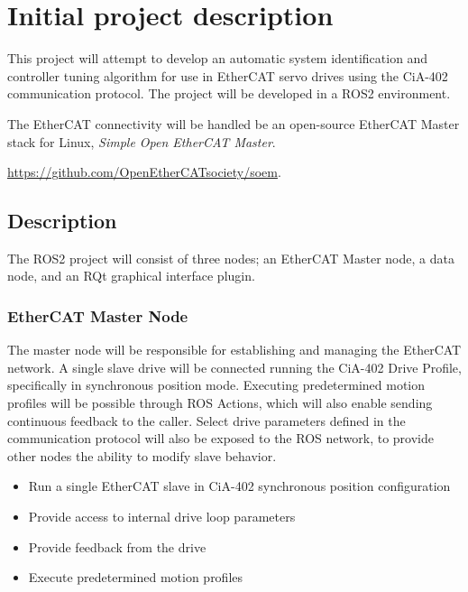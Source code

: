 \newcommand\pdescitemsep{-0.2em}
\section{Initial project description}

This project will attempt to develop an automatic system identification and controller tuning algorithm for use in EtherCAT servo drives using the CiA-402 communication protocol.
The project will be developed in a ROS2 environment. 
 
The EtherCAT connectivity will be handled be an open-source EtherCAT Master stack for Linux, \textit{Simple Open EtherCAT Master}.

\href{https://github.com/OpenEtherCATsociety/soem}{https://github.com/OpenEtherCATsociety/soem}. 

\subsection{Description}

\noindent
The ROS2 project will consist of three nodes; an EtherCAT Master node, a data node, and an RQt graphical interface plugin. 


\subsubsection{EtherCAT Master Node}

The master node will be responsible for establishing and managing the EtherCAT network.
A single slave drive will be connected running the CiA-402 Drive Profile, specifically in synchronous position mode.
Executing predetermined motion profiles will be possible through ROS Actions, which will also enable sending continuous feedback to the caller. 
Select drive parameters defined in the communication protocol will also be exposed to the ROS network, to provide other nodes the ability to modify slave behavior. 

\begin{itemize}
	\setlength\itemsep{\pdescitemsep}
	\item Run a single EtherCAT slave in CiA-402 synchronous position configuration
	\item Provide access to internal drive loop parameters
	\item Provide feedback from the drive
	\item Execute predetermined motion profiles
\end{itemize}

